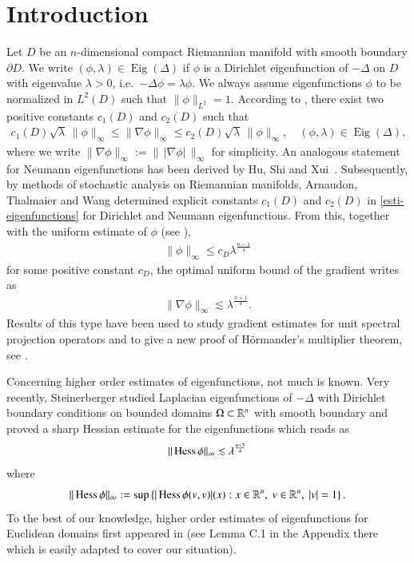 \documentclass[11pt,reqno]{amsart}
\theoremstyle{definition} \newtheorem{remark}[theorem]{Remark}
\numberwithin{equation}{section}
\newcommand\1{\mathbbm{1}}
\def\Eig{\operatorname{Eig}} \def\II{{\operatorname{II}}}
\def\r{\right}
\def\l{\left} \def\e{\operatorname{e}} \def\dsum{\displaystyle\sum}
\def\II{{\operatorname{II}}}
\begin{document}
\section{Introduction\label{s1}}
Let $D$ be an $n$-dimensional compact Riemannian manifold with smooth 
boundary $\partial D$. We write
$(\phi, \lambda) \in \Eig(\Delta)$ if $\phi$ is a
Dirichlet eigenfunction of $-\Delta$ on $D$ with eigenvalue
$\lambda>0$, i.e.~$-\Delta\phi=\lambda\phi$.
We always assume eigenfunctions $\phi$ to be normalized in
$L^2(D)$ such that $\|\phi\|_{L^2}=1$. According to \cite{SX}, there exist two positive constants
$c_{1}(D)$ and $c_{2}(D)$ such that
\begin{align}\label{esti-eigenfunctions}
  c_{1}(D) \sqrt{\lambda}\,\|\phi\|_{\infty} \leqslant\|\nabla \phi\|_{\infty}
  \leqslant c_{2}(D) \sqrt{\lambda}\,\|\phi\|_{\infty}, \quad(\phi,\lambda)\in\Eig(\Delta),
\end{align}
where we write
$\|\nabla \phi\|_{\infty}:=\|\,|\nabla \phi|\,\|_{\infty}$ for
simplicity.  An analogous statement for Neumann eigenfunctions has
been derived by Hu, Shi and Xui~\cite{HSX}. Subsequently, by methods
of stochastic analysis on Riemannian manifolds, Arnaudon, Thalmaier
and Wang \cite{ATW} determined explicit constants $c_1(D)$ and $c_2(D)$ in
\eqref{esti-eigenfunctions} for Dirichlet and Neumann
eigenfunctions. From this, together with the uniform estimate of $\phi$ (see
\cite{Hormander,Grieser,Levitan}),
\begin{align*}
  \|\phi\|_{\infty}\leq c_D\lambda^{\frac{n-1}{4}}
\end{align*}
for some positive constant $c_D$,
the optimal uniform bound of the gradient writes as
\begin{align*}
  \|\nabla\phi\|_{\infty}\lesssim \lambda ^{\frac{n+1}{4}}.
\end{align*}
Results of this type have been used to study gradient estimates for unit
spectral projection operators and to give a new proof of
H\"{o}rmander's multiplier theorem, see \cite{XuPhDThesis,
  Xu2007,Xu2009}.

Concerning higher order estimates of eigenfunctions, not much is known.
Very recently, Steinerberger \cite{Ster} studied Laplacian
eigenfunctions of $-\Delta $ with Dirichlet boundary conditions on bounded
domains $\Omega \subset \mathbb{R}^n$ with smooth boundary and proved a sharp
Hessian estimate for the eigenfunctions which reads as
\begin{align*}
  \|\Hess \phi\|_{\infty}\lesssim %
  \lambda^{\frac{n+3}{4}}
\end{align*}
where $$ \|\Hess \phi\|_{\infty}:=\sup\l\{|\Hess \phi(v,v)|(x): x\in \R^n,\ v\in \R^n, \  |v|=1\r\}.$$
To the best of our knowledge, higher order estimates of eigenfunctions for Euclidean domains
first appeared in \cite{Frank-Seiringer} (see Lemma C.1 in the Appendix there
which is easily adapted to cover our situation).
\end{document}
